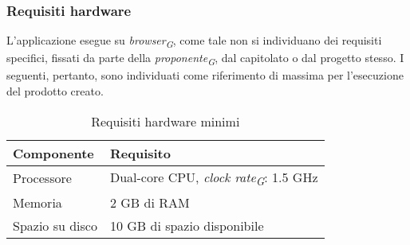 \subsubsection{Requisiti hardware}
L’applicazione esegue su \textit{browser}\textsubscript{\textit{G}}, come tale non si individuano dei requisiti specifici, fissati da parte
della \textit{proponente}\textsubscript{\textit{G}}, dal capitolato o dal progetto stesso. I seguenti, pertanto, sono individuati come
riferimento di massima per l’esecuzione del prodotto creato.   
\begin{table}[H]
    \centering
    \begin{tabular}{ll}
        \toprule
        \textbf{Componente} & \textbf{Requisito} \\
        \midrule
        Processore & Dual-core CPU, \textit{clock rate}\textsubscript{\textit{G}}: 1.5 GHz \\
        Memoria & 2 GB di RAM \\
        Spazio su disco & 10 GB di spazio disponibile\\
        \bottomrule
    \end{tabular}
    \caption{Requisiti hardware minimi}
\end{table}